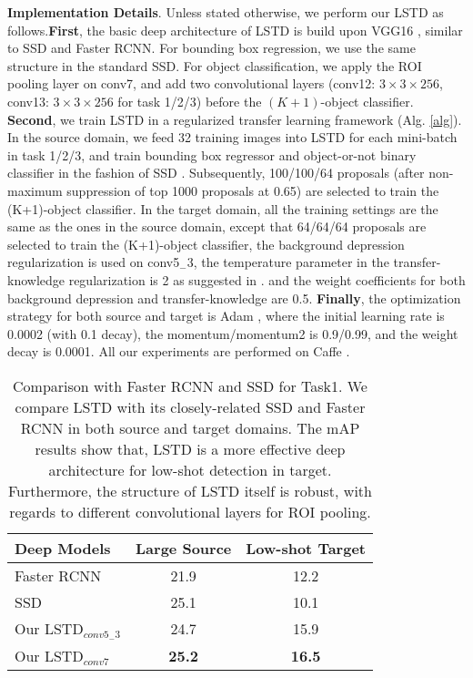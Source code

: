 \documentclass[letterpaper]{article} \usepackage{aaai18}  \usepackage{times}  \usepackage{helvet}  \usepackage{courier}  \usepackage{url}  \usepackage{graphicx}
\begin{document}
\textbf{Implementation Details}.
Unless stated otherwise,
we perform our LSTD as follows.\textbf{First},
the basic deep architecture of LSTD is build upon VGG16 \cite{simonyan2014very},
similar to SSD and Faster RCNN.
For bounding box regression,
we use the same structure in the standard SSD.
For object classification,
we apply the ROI pooling layer on conv7,
and add two convolutional layers (conv12: $3\times3\times256$, conv13: $3\times3\times256$ for task 1/2/3) before the $(K+1)$-object classifier.
\textbf{Second},
we train LSTD in a regularized transfer learning framework (Alg. \ref{alg}).
In the source domain,
we feed 32 training images into LSTD for each mini-batch in task 1/2/3,
and train bounding box regressor and object-or-not binary classifier in the fashion of SSD \cite{Liueccv2016}.
Subsequently,
100/100/64 proposals (after non-maximum suppression of top 1000 proposals at 0.65) are selected to train the (K+1)-object classifier.
In the target domain,
all the training settings are the same as the ones in the source domain,
except that
64/64/64 proposals are selected to train the (K+1)-object classifier,
the background depression regularization is used on conv5$_{-}$3,
the temperature parameter in the transfer-knowledge regularization is 2 as suggested in \cite{Hinton2015}.
and the weight coefficients for both background depression and transfer-knowledge are 0.5.
\textbf{Finally},
the optimization strategy for both source and target is Adam \cite{Kingma2015},
where
the initial learning rate is 0.0002 (with 0.1 decay),
the momentum/momentum2 is 0.9/0.99,
and the weight decay is 0.0001.
All our experiments are performed on Caffe \cite{jia2014caffe}.


\begin{table}[t]
\centering
\begin{tabular}{l|cc}
  \hline
Deep Models & Large Source & Low-shot Target\\
  \hline
  Faster RCNN & 21.9  & 12.2  \\
  SSD & 25.1 & 10.1 \\
  \hline
  Our LSTD$_{conv5_{-}3}$ & 24.7  & 15.9  \\
  Our LSTD$_{conv7}$ & \textbf{25.2}  & \textbf{16.5}  \\
  \hline
\end{tabular}
\caption{Comparison with Faster RCNN and SSD for Task1.
We compare LSTD with its closely-related SSD \cite{Liueccv2016} and Faster RCNN \cite{Renpami2016} in both source and target domains.
The mAP results show that,
LSTD is a more effective deep architecture for low-shot detection in target.
Furthermore,
the structure of LSTD itself is robust,
with regards to different convolutional layers for ROI pooling.}
\label{LSTDSourceTarget}
\end{table}
\end{document}
